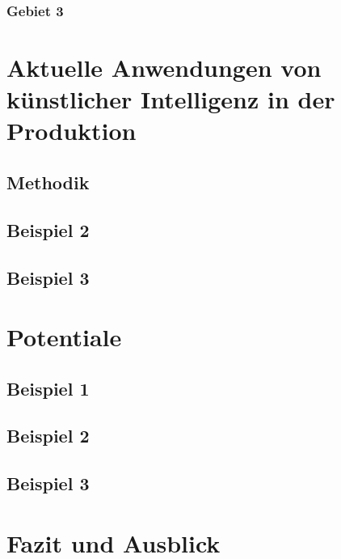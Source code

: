 \documentclass[a4paper,12pt, german]{report}
\begin{document}
\subsection{Gebiet 3}


\chapter{Aktuelle Anwendungen von künstlicher Intelligenz in der Produktion}


\section{Methodik}

\section{Beispiel 2}

\section{Beispiel 3}

\chapter{Potentiale}

\section{Beispiel 1}

\section{Beispiel 2}

\section{Beispiel 3}


\chapter{Fazit und Ausblick}

\listoffigures

\clearpage




\appendix
\end{document}
